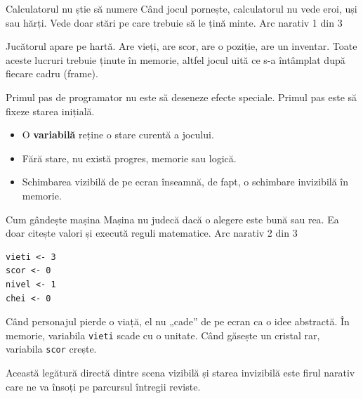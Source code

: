 \PageHeader
  {Calculatorul nu știe să numere}
  {Când jocul pornește, calculatorul nu vede eroi, uși sau hărți. Vede doar stări pe care trebuie să le țină minte.}
  {Arc narativ 1 din 3}

\begin{missionbox}
Jucătorul apare pe hartă. Are vieți, are scor, are o poziție, are un inventar. Toate aceste lucruri trebuie ținute în memorie, altfel jocul uită ce s-a întâmplat după fiecare cadru (frame).

Primul pas de programator nu este să deseneze efecte speciale. Primul pas este să fixeze starea inițială.
\end{missionbox}

\begin{conceptbox}[Reținem!]
\begin{itemize}
\item O \textbf{variabilă} reține o stare curentă a jocului.
\item Fără stare, nu există progres, memorie sau logică.
\item Schimbarea vizibilă de pe ecran înseamnă, de fapt, o schimbare invizibilă în memorie.
\end{itemize}
\end{conceptbox}


\clearpage

\PageHeader
  {Cum gândește mașina}
  {Mașina nu judecă dacă o alegere este bună sau rea. Ea doar citește valori și execută reguli matematice.}
  {Arc narativ 2 din 3}

\begin{machinebox}
\begin{lstlisting}[style=codequest]
vieti <- 3
scor <- 0
nivel <- 1
chei <- 0
\end{lstlisting}
\end{machinebox}

\begin{missionbox}
Când personajul pierde o viață, el nu „cade” de pe ecran ca o idee abstractă. În memorie, variabila \texttt{vieti} scade cu o unitate. Când găsește un cristal rar, variabila \texttt{scor} crește.

Această legătură directă dintre scena vizibilă și starea invizibilă este firul narativ care ne va însoți pe parcursul întregii reviste.
\end{missionbox}


